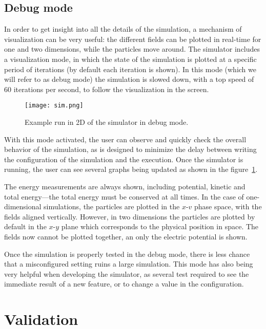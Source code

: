 \subsection{Debug mode}

In order to get insight into all the details of the simulation, a mechanism of 
visualization can be very useful: the different fields can be plotted in 
real-time for one and two dimensions, while the particles move around. The 
simulator includes a visualization mode, in which the state of the simulation is 
plotted at a specific period of iterations (by default each iteration is shown).  
In this mode (which we will refer to as debug mode) the simulation is slowed 
down, with a top speed of 60 iterations per second, to follow the visualization 
in the screen.


%
\begin{figure}[h]
	\centering
	\texttt{[image: sim.png]}
	\caption{Example run in 2D of the simulator in debug mode.}
	\label{fig:debug-mode}
\end{figure}

With this mode activated, the user can observe and quickly check the overall 
behavior of the simulation, as is designed to minimize the delay between writing 
the configuration of the simulation and the execution. Once the simulator is 
running, the user can see several graphs being updated as shown in the 
figure~\ref{fig:debug-mode}.

The energy measurements are always shown, including potential, kinetic and total 
energy---the total energy must be conserved at all times. In the case of 
one-dimensional simulations, the particles are plotted in the $x$-$v$ phase 
space, with the fields aligned vertically. However, in two dimensions the 
particles are plotted by default in the $x$-$y$ plane which corresponds to the 
physical position in space. The fields now cannot be plotted together, an only 
the electric potential is shown.

Once the simulation is properly tested in the debug mode, there is less chance 
that a misconfigured setting ruins a large simulation. This mode has also being 
very helpful when developing the simulator, as several test required to see the 
immediate result of a new feature, or to change a value in the configuration.

\section{Validation}

